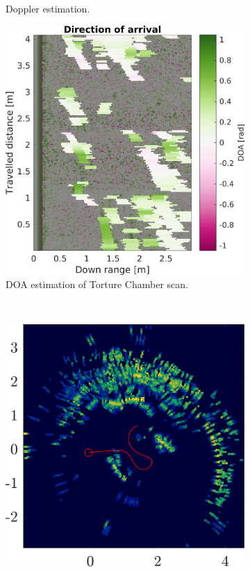 \begin{figure}[htbp]
\begin{subfigure}[t]{.3\textwidth}
        \caption{Doppler estimation.}
        \label{fig:pres3-d}
    \end{subfigure}%
    \hfill%
    \begin{subfigure}[t]{.3\textwidth}
        \includegraphics[max width=\linewidth]{gfx/figures/t_doa.png}
        \caption{DOA estimation of Torture Chamber scan.}
        \label{fig:pres3-doa}
    \end{subfigure}\bigskip\\
    \begin{subfigure}[t]{.4\textwidth}
        \includegraphics[max width=\linewidth]{gfx/results/torturechamber_reprojection.png}

\end{subfigure}
\end{figure}

